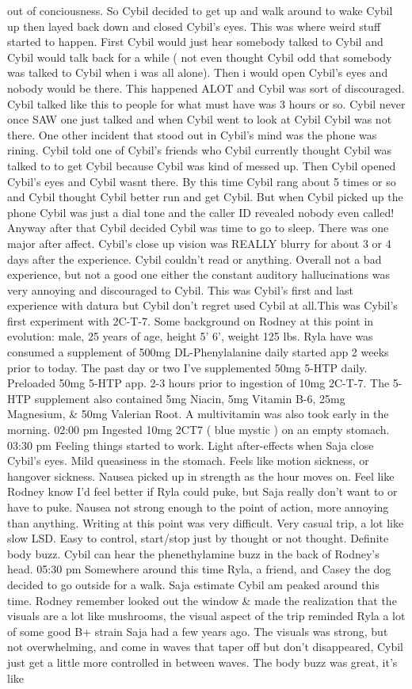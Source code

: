 \documentclass[12pt]{book}
\begin{document}
out of conciousness. So Cybil decided to get up and walk around to wake Cybil up then layed back down and closed Cybil's eyes. This was where weird stuff started to happen. First Cybil would just hear somebody talked to Cybil and Cybil would talk back for a while ( not even thought Cybil odd that somebody was talked to Cybil when i was all alone). Then i would open Cybil's eyes and nobody would be there. This happened ALOT and Cybil was sort of discouraged. Cybil talked like this to people for what must have was 3 hours or so. Cybil never once SAW one just talked and when Cybil went to look at Cybil Cybil was not there. One other incident that stood out in Cybil's mind was the phone was rining. Cybil told one of Cybil's friends who Cybil currently thought Cybil was talked to to get Cybil because Cybil was kind of messed up. Then Cybil opened Cybil's eyes and Cybil wasnt there. By this time Cybil rang about 5 times or so and Cybil thought Cybil better run and get Cybil. But when Cybil picked up the phone Cybil was just a dial tone and the caller ID revealed nobody even called! Anyway after that Cybil decided Cybil was time to go to sleep. There was one major after affect. Cybil's close up vision was REALLY blurry for about 3 or 4 days after the experience. Cybil couldn't read or anything. Overall not a bad experience, but not a good one either the constant auditory hallucinations was very annoying and discouraged to Cybil. This was Cybil's first and last experience with datura but Cybil don't regret used Cybil at all.This was Cybil's first experiment with 2C-T-7. Some background on Rodney at this point in evolution: male, 25 years of age, height 5' 6', weight 125 lbs. Ryla have was consumed a supplement of 500mg DL-Phenylalanine daily started app 2 weeks prior to today. The past day or two I've supplemented 50mg 5-HTP daily. Preloaded 50mg 5-HTP app. 2-3 hours prior to ingestion of 10mg 2C-T-7. The 5-HTP supplement also contained 5mg Niacin, 5mg Vitamin B-6, 25mg Magnesium, \& 50mg Valerian Root. A multivitamin was also took early in the morning. 02:00 pm Ingested 10mg 2CT7 ( blue mystic ) on an empty stomach. 03:30 pm Feeling things started to work. Light after-effects when Saja close Cybil's eyes. Mild queasiness in the stomach. Feels like motion sickness, or hangover sickness. Nausea picked up in strength as the hour moves on. Feel like Rodney know I'd feel better if Ryla could puke, but Saja really don't want to or have to puke. Nausea not strong enough to the point of action, more annoying than anything. Writing at this point was very difficult. Very casual trip, a lot like slow LSD. Easy to control, start/stop just by thought or not thought. Definite body buzz. Cybil can hear the phenethylamine buzz in the back of Rodney's head. 05:30 pm Somewhere around this time Ryla, a friend, and Casey the dog decided to go outside for a walk. Saja estimate Cybil am peaked around this time. Rodney remember looked out the window \& made the realization that the visuals are a lot like mushrooms, the visual aspect of the trip reminded Ryla a lot of some good B+ strain Saja had a few years ago. The visuals was strong, but not overwhelming, and come in waves that taper off but don't disappeared, Cybil just get a little more controlled in between waves. The body buzz was great, it's like 
\end{document}

